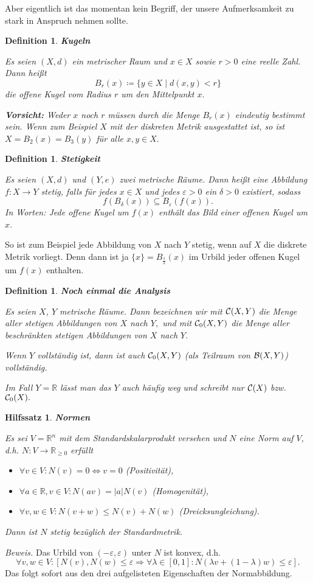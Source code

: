 \documentclass[12pt]{scrbook}   %
\newtheorem{hilfsX}[alles]{Hilfssatz}
\newenvironment{hilfs}[1]{\begin{hilfsX}{\bf #1}\par}{\end{hilfsX}}
\newtheorem{definiX}[alles]{Definition}
\newenvironment{defini}[1]{\begin{definiX}{\bf #1}\par\rm}{\end{definiX}}
\newcommand{\da}{\coloneqq}
\begin{document}
Aber eigentlich ist das momentan kein Begriff, der unsere Aufmerksamkeit zu 
stark in Anspruch nehmen sollte. 

\begin{defini}{Kugeln}
Es seien $(X,d)$ ein metrischer Raum und $x\in X$ sowie $r>0$ eine reelle 
Zahl. Dann heißt
$$B_r(x) \da \{y\in X \mid d(x,y)<r\}$$
die {\it offene Kugel} vom Radius $r$ um den Mittelpunkt $x.$ 

{\bf Vorsicht:} Weder $x$ noch $r$ müssen durch die Menge $B_r(x)$ eindeutig 
bestimmt sein.
Wenn zum Beispiel $X$ mit der diskreten Metrik ausgestattet ist, so ist 
$X=B_2(x) = B_3(y)$ für alle $x,y\in X.$
\end{defini}

\begin{defini}{Stetigkeit}
\label{stetig1}
Es seien $(X,d)$ und $(Y,e)$ zwei metrische Räume. Dann heißt eine
Abbildung $f:X\longrightarrow Y$ {\rm stetig}, falls für jedes 
$x\in X$ und jedes $\varepsilon>0$ ein $\delta>0$ existiert, sodass
$$f(B_\delta(x)) \subseteq B_\varepsilon(f(x)).$$
In Worten: Jede offene Kugel um $f(x)$ enthält das Bild einer offenen Kugel 
um $x$.
\end{defini}

So ist zum Beispiel jede Abbildung von $X$ nach $Y$ stetig, wenn auf $X$ die 
diskrete Metrik vorliegt. Denn dann ist ja $\{x\} = B_{\frac12}(x)$ im Urbild
jeder offenen Kugel um $f(x)$ enthalten.

\begin{defini}{Noch einmal die Analysis}
Es seien $X$, $Y$ metrische Räume. Dann bezeichnen wir mit 
${\cal C}(X,Y)$ die Menge aller stetigen Abbildungen von $X$ nach $Y,$ und 
mit ${\cal C}_0(X,Y)$ die Menge aller beschränkten stetigen Abbildungen
von $X$ nach $Y.$ 

Wenn $Y$ vollständig ist, dann ist auch ${\cal C}_0(X,Y)$ (als Teilraum von
${\cal B}(X,Y)$) vollständig. 

Im Fall $Y=\mathbb R$ lässt man das $Y$ auch häufig weg und schreibt nur 
${\cal C}(X)$ bzw.\ ${\cal C}_0(X).$
\end{defini}

\begin{hilfs}{Normen}\label{Normen}
Es sei $V=\mathbb R^n$ mit dem Standardskalarprodukt versehen und $N$ eine
Norm auf $V,$ d.h. $N:V\longrightarrow \mathbb R_{\geq 0}$ erfüllt 
\begin{itemize}
\item $\forall v\in V:N(v) = 0 \iff v=0$ (Positivität),
\item $\forall a\in \mathbb R,v\in V: N(av) = |a|N(v)$ (Homogenität),
\item $\forall v,w\in V: N(v+w) \leq N(v) + N(w)$ (Dreicksungleichung).
\end{itemize}
Dann ist $N$ stetig bezüglich der Standardmetrik.
\end{hilfs}
{\it Beweis.} Das Urbild von $(-\varepsilon , \varepsilon)$ unter $N$ ist 
konvex, d.h. 
$$\forall v,w\in V: [N(v),N(w)\leq \varepsilon\Rightarrow 
\forall \lambda\in [0,1]: N(\lambda v + (1-\lambda) w) \leq \varepsilon].$$
Das folgt sofort aus den drei aufgelisteten Eigenschaften der Normabbildung. 
\end{document}
